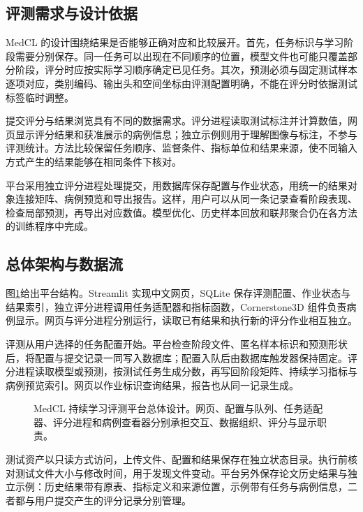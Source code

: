 \subsection{评测需求与设计依据}
\label{subsec:medcl-requirements}

MedCL 的设计围绕结果是否能够正确对应和比较展开。首先，任务标识与学习阶段需要分别保存。同一任务可以出现在不同顺序的位置，模型文件也可能只覆盖部分阶段，评分时应按实际学习顺序确定已见任务。其次，预测必须与固定测试样本逐项对应，类别编码、输出头和空间坐标由评测配置明确，不能在评分时依据测试标签临时调整。

提交评分与结果浏览具有不同的数据需求。评分进程读取测试标注并计算数值，网页显示评分结果和获准展示的病例信息；独立示例则用于理解图像与标注，不参与评测统计。方法比较保留任务顺序、监督条件、指标单位和结果来源，使不同输入方式产生的结果能够在相同条件下核对。

平台采用独立评分进程处理提交，用数据库保存配置与作业状态，用统一的结果对象连接矩阵、病例预览和导出报告。这样，用户可以从同一条记录查看阶段表现、检查局部预测，再导出对应数值。模型优化、历史样本回放和联邦聚合仍在各方法的训练程序中完成。

\subsection{总体架构与数据流}
\label{subsec:medcl-architecture}


图\ref{fig:medcl-platform-architecture}给出平台结构。Streamlit 实现中文网页，SQLite 保存评测配置、作业状态与结果索引，独立评分进程调用任务适配器和指标函数，Cornerstone3D 组件负责病例显示。网页与评分进程分别运行，读取已有结果和执行新的评分作业相互独立。

评测从用户选择的任务配置开始。平台检查阶段文件、匿名样本标识和预测形状后，将配置与提交记录一同写入数据库；配置入队后由数据库触发器保持固定。评分进程读取模型或预测，按测试任务生成分数，再写回阶段矩阵、持续学习指标与病例预览索引。网页以作业标识查询结果，报告也从同一记录生成。

\begin{figure}[htbp]
\centering
\resizebox{\thesisfigurewidth}{!}{}
\caption[MedCL 持续学习评测平台总体设计]{MedCL 持续学习评测平台总体设计。网页、配置与队列、任务适配器、评分进程和病例查看器分别承担交互、数据组织、评分与显示职责。}
\label{fig:medcl-platform-architecture}
\end{figure}

测试资产以只读方式访问，上传文件、配置和结果保存在独立状态目录。执行前核对测试文件大小与修改时间，用于发现文件变动。平台另外保存论文历史结果与独立示例：历史结果带有原表、指标定义和来源位置，示例带有任务与病例信息，二者都与用户提交产生的评分记录分别管理。

